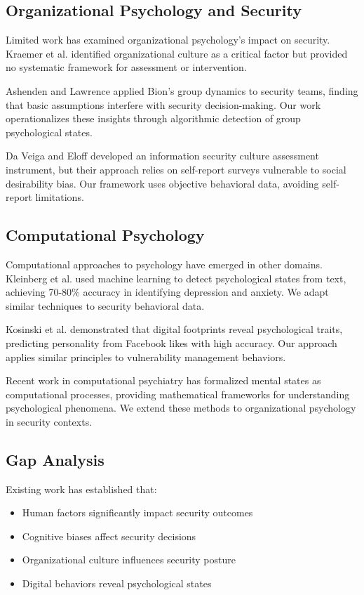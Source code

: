 \documentclass[11pt,a4paper]{article}
\begin{document}
\subsection{Organizational Psychology and Security}

Limited work has examined organizational psychology's impact on security. Kraemer et al.\cite{kraemer2009} identified organizational culture as a critical factor but provided no systematic framework for assessment or intervention.

Ashenden and Lawrence\cite{ashenden2016} applied Bion's group dynamics to security teams, finding that basic assumptions interfere with security decision-making. Our work operationalizes these insights through algorithmic detection of group psychological states.

Da Veiga and Eloff\cite{daveiga2010} developed an information security culture assessment instrument, but their approach relies on self-report surveys vulnerable to social desirability bias. Our framework uses objective behavioral data, avoiding self-report limitations.

\subsection{Computational Psychology}

Computational approaches to psychology have emerged in other domains. Kleinberg et al.\cite{kleinberg2017} used machine learning to detect psychological states from text, achieving 70-80\% accuracy in identifying depression and anxiety. We adapt similar techniques to security behavioral data.

Kosinski et al.\cite{kosinski2013} demonstrated that digital footprints reveal psychological traits, predicting personality from Facebook likes with high accuracy. Our approach applies similar principles to vulnerability management behaviors.

Recent work in computational psychiatry\cite{huys2016} has formalized mental states as computational processes, providing mathematical frameworks for understanding psychological phenomena. We extend these methods to organizational psychology in security contexts.

\subsection{Gap Analysis}

Existing work has established that:
\begin{itemize}
\item Human factors significantly impact security outcomes
\item Cognitive biases affect security decisions
\item Organizational culture influences security posture
\item Digital behaviors reveal psychological states
\end{itemize}
\end{document}
